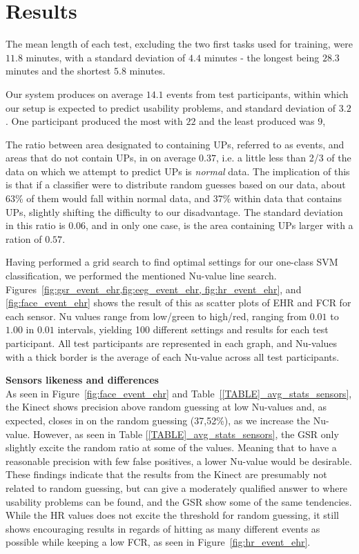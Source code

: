 \section{Results}
The mean length of each test, excluding the two first tasks used for training, were $11.8$ minutes, with a standard
deviation of $4.4$ minutes - the longest being $28.3$ minutes and the shortest $5.8$ minutes.

Our system produces on average $14.1$ events from test participants, within which our setup is expected to predict
usability problems, and standard deviation of $3.2$. One participant produced the most with $22$ and the least produced
was $9$,

The ratio between area designated to containing UPs, referred to as events, and areas that do not contain UPs, in on
average $0.37$, i.e. a little less than 2/3 of the data on which we attempt to predict UPs is \textit{normal} data. The
implication of this is that if a classifier were to distribute random guesses based on our data, about 63\% of them
would fall within normal data, and 37\% within data that contains UPs, slightly shifting the difficulty to our
disadvantage. The standard deviation in this ratio is $0.06$, and in only one case, is the area containing UPs larger
with a ration of $0.57$.



Having performed a grid search to find optimal settings for our one-class SVM classification, we performed the mentioned
Nu-value line search. Figures~\ref{fig:gsr_event_ehr,fig:eeg_event_ehr, fig:hr_event_ehr}, and \ref{fig:face_event_ehr}
shows the result of this as scatter plots of EHR and FCR for each sensor. Nu values range from low/green to high/red,
ranging from $0.01$ to $1.00$ in $0.01$ intervals, yielding 100 different settings and results for each test
participant. All test participants are represented in each graph, and Nu-values with a thick border is the average of
each Nu-value across all test participants.

\textbf{Sensors likeness and differences}\\



As seen in Figure~\ref{fig:face_event_ehr} and Table~\ref{[TABLE]_avg_stats_sensors}, the Kinect shows precision above random guessing at low Nu-values and,
as expected, closes in on the random guessing (37,52\%), as we increase the Nu-value. However, as seen in Table
\ref{[TABLE]_avg_stats_sensors}, the GSR only slightly excite the random ratio at some of the values. Meaning that
to have a reasonable precision with few false positives, a lower Nu-value would be desirable.
These findings indicate that the results from the Kinect are presumably not related to random guessing, but can give a moderately qualified answer to where usability problems can be found, and the GSR show some of the same tendencies.
While the HR values does not excite the threshold for random guessing, it still shows encouraging results in regards of hitting as many different events as possible while keeping a low FCR, as seen in Figure~\ref{fig:hr_event_ehr}.

